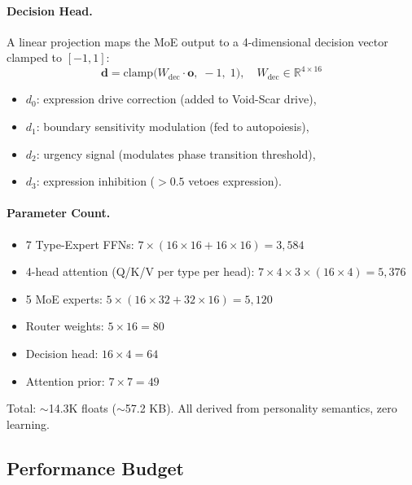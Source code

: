 \documentclass[11pt]{article}
\begin{document}
\paragraph{Decision Head.}
A linear projection maps the MoE output to a 4-dimensional decision vector clamped to $[-1, 1]$:
\begin{equation}
\mathbf{d} = \text{clamp}\bigl(W_{\text{dec}} \cdot \mathbf{o},\; -1,\; 1\bigr), \quad W_{\text{dec}} \in \mathbb{R}^{4 \times 16}
\end{equation}
\begin{itemize}
\item $d_0$: expression drive correction (added to Void-Scar drive),
\item $d_1$: boundary sensitivity modulation (fed to autopoiesis),
\item $d_2$: urgency signal (modulates phase transition threshold),
\item $d_3$: expression inhibition ($> 0.5$ vetoes expression).
\end{itemize}

\paragraph{Parameter Count.}
\begin{itemize}
\item 7 Type-Expert FFNs: $7 \times (16 \times 16 + 16 \times 16) = 3{,}584$
\item 4-head attention (Q/K/V per type per head): $7 \times 4 \times 3 \times (16 \times 4) = 5{,}376$
\item 5 MoE experts: $5 \times (16 \times 32 + 32 \times 16) = 5{,}120$
\item Router weights: $5 \times 16 = 80$
\item Decision head: $16 \times 4 = 64$
\item Attention prior: $7 \times 7 = 49$
\end{itemize}
Total: $\sim$14.3K floats ($\sim$57.2 KB). All derived from personality semantics, zero learning.

\subsection{Performance Budget}
\end{document}
